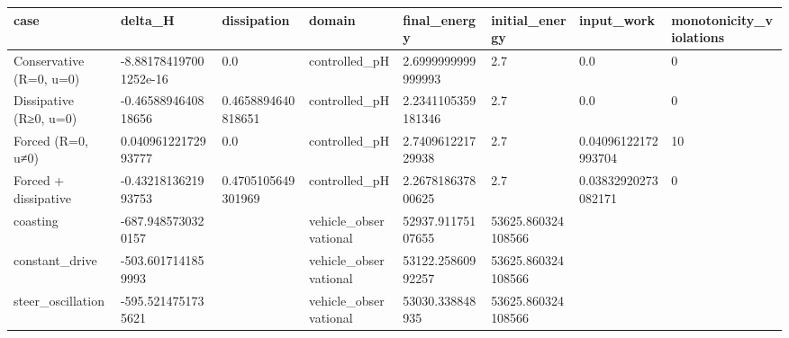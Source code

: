 \begin{tabular}{llllllll}
 \toprule
case & delta\_H & dissipation & domain & final\_energy & initial\_energy & input\_work & monotonicity\_violations \\ \midrule
Conservative (R=0, u=0) & -8.881784197001252e-16 & 0.0 & controlled\_pH & 2.6999999999999993 & 2.7 & 0.0 & 0 \\
Dissipative (R≥0, u=0) & -0.4658894640818656 & 0.4658894640818651 & controlled\_pH & 2.2341105359181346 & 2.7 & 0.0 & 0 \\
Forced (R=0, u≠0) & 0.04096122172993777 & 0.0 & controlled\_pH & 2.740961221729938 & 2.7 & 0.04096122172993704 & 10 \\
Forced + dissipative & -0.4321813621993753 & 0.4705105649301969 & controlled\_pH & 2.267818637800625 & 2.7 & 0.03832920273082171 & 0 \\
coasting & -687.9485730320157 &  & vehicle\_observational & 52937.91175107655 & 53625.860324108566 &  &  \\
constant\_drive & -503.6017141859993 &  & vehicle\_observational & 53122.25860992257 & 53625.860324108566 &  &  \\
steer\_oscillation & -595.5214751735621 &  & vehicle\_observational & 53030.338848935 & 53625.860324108566 &  &  \\
\bottomrule
\end{tabular}